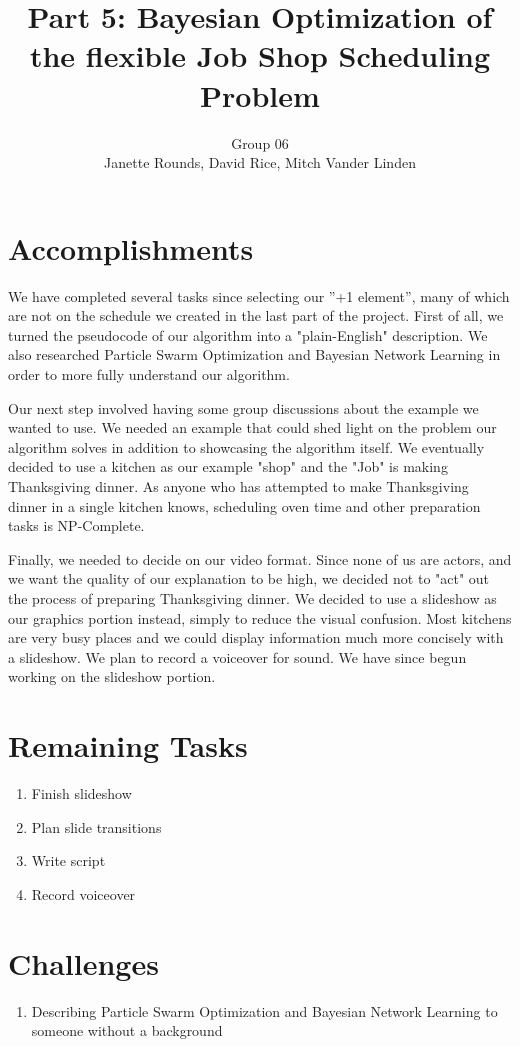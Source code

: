 \documentclass[11pt,twocolumn]{article}
\title{Part 5: Bayesian Optimization of the flexible Job Shop Scheduling Problem}
\author{Group 06 \\ 
\small Janette Rounds, \small David Rice, \small Mitch Vander Linden}
\begin{document}
	\section{Accomplishments}
	
	We have completed several tasks since selecting our ''+1 element'', many of which are not on the schedule we created in the last part of the project. First of all, we turned the pseudocode of our algorithm into a "plain-English" description. We also researched Particle Swarm Optimization and Bayesian Network Learning in order to more fully understand our algorithm. 
	
	Our next step involved having some group discussions about the example we wanted to use. We needed an example that could shed light on the problem our algorithm solves in addition to showcasing the algorithm itself. We eventually decided to use a kitchen as our example "shop" and the "Job" is making Thanksgiving dinner. As anyone who has attempted to make Thanksgiving dinner in a single kitchen knows, scheduling oven time and other preparation tasks is NP-Complete. 
	
	Finally, we needed to decide on our video format. Since none of us are actors, and we want the quality of our explanation to be high, we decided not to "act" out the process of preparing Thanksgiving dinner. We decided to use a slideshow as our graphics portion instead, simply to reduce the visual confusion. Most kitchens are very busy places and we could display information much more concisely with a slideshow. We plan to record a voiceover for sound. We have since begun working on the slideshow portion. 
	
	\section{Remaining Tasks}
	
	\begin{enumerate}
		\item Finish slideshow
		\item Plan slide transitions
		\item Write script
		\item Record voiceover
	\end{enumerate}
	\section{Challenges}
	\begin{enumerate}
		\item Describing Particle Swarm Optimization and Bayesian Network Learning to someone without a background 
	\end{enumerate}
\end{document}
